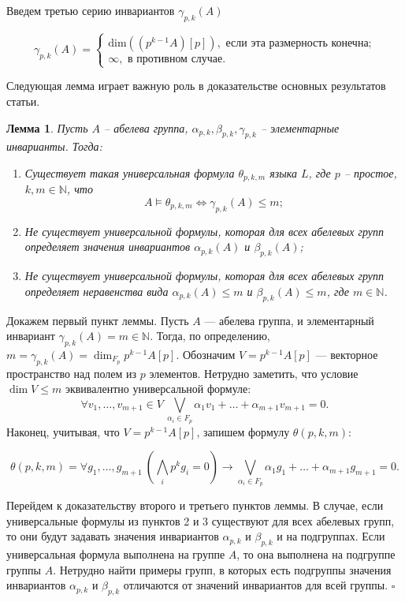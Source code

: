 \documentclass[a4paper,11pt,twoside]{article}
\newtheorem{lemma}{Лемма}[section]
\def\proof{{\noindent{\bf Доказательство.}} }
\def\N{{\mathbb{N}}}
\begin{document}
Введем третью серию инвариантов $\gamma_{p,k}(A)$

$$\gamma_{p,k}(A) = \left\lbrace 
\begin{array}{l}  
\mathrm{dim} \left( (p^{k-1} A) [p] \right), \text{ если эта размерность конечна;} \\ 
\infty, \text{ в противном случае.}
\end{array} 
\right.$$

Следующая лемма играет важную роль в доказательстве основных результатов статьи.

\begin{lemma}\label{lemma:gamma}
Пусть $A$ -- абелева группа, $\alpha_{p,k}, \beta_{p,k}, \gamma_{p,k}$ -- элементарные инварианты. Тогда:
\begin{enumerate}
\item Существует такая универсальная формула $\theta_{p,k,m}$ языка $L$, где $p$ -- простое, $k,m \in \N$, что 
$$A \models \theta_{p,k,m} \Leftrightarrow \gamma_{p,k}(A) \leq m;$$
\item Не существует универсальной формулы, которая для всех абелевых групп определяет значения инвариантов $\alpha_{p,k}(A)$ и $\beta_{p,k}(A)$;

\item Не существует универсальной формулы, которая для всех абелевых групп определяет неравенства вида $\alpha_{p,k}(A) \leq m$ и $\beta_{p,k}(A) \leq m$, где $m \in \N$.
\end{enumerate}
\end{lemma}
\proof Докажем первый пункт леммы. Пусть $A$ --- абелева группа, и элементарный инвариант $\gamma_{p,k}(A) = m \in \N$. Тогда, по определению, $m = \gamma_{p,k} (A) = \dim_{F_p} p^{k-1} A[p]$. Обозначим $V = p^{k-1} A[p]$ --- векторное пространство над полем из $p$ элементов. Нетрудно заметить, что условие $\dim V \leq m$ эквивалентно универсальной формуле: 
$$\forall v_1, \ldots, v_{m+1} \in V \ \bigvee_{\alpha_i \in F_p} \alpha_1v_1 + \ldots + \alpha_{m+1}v_{m+1} = 0.$$
Наконец, учитывая, что $V = p^{k-1}A[p]$, запишем формулу $\theta(p,k,m)$:

$$
\theta(p,k,m) = \forall g_1, \ldots, g_{m+1} \ (\bigwedge_i p^{k}g_{i} = 0) \rightarrow  \bigvee_{\alpha_i \in F_p} \alpha_1g_1 + \ldots + \alpha_{m+1}g_{m+1} = 0.
$$

Перейдем к доказательству второго и третьего пунктов леммы. В случае, если универсальные формулы из пунктов 2 и 3 существуют для  всех абелевых групп, то они будут задавать значения инвариантов $\alpha_{p,k}$ и $\beta_{p,k}$ и на подгруппах. Если универсальная формула выполнена на группе $A$, то она выполнена на подгруппе группы $A$. Нетрудно найти примеры групп, в которых есть подгруппы значения инвариантов $\alpha_{p,k}$ и $\beta_{p,k}$ отличаются от значений инвариантов для всей группы. $\square$
\end{document}
